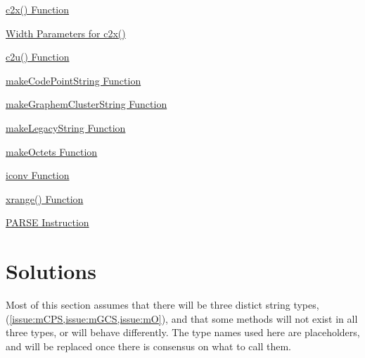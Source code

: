 \documentclass[b4paper]{article}
\begin{document}
\begin{issue}[label=I\arabic*,ref=\fbox{I\arabic*}]
\item{\href{https://github.com/users/RexxLA/projects/2/views/6?pane=issue&itemId=35730987}%
{c2x() Function}}
\label{issue:c2x}

\item{\href{https://github.com/users/RexxLA/projects/2/views/6?pane=issue&itemId=35731048}%
{Width Parameters for c2x()}}
\label{issue:c2xW}

\item{\href{https://github.com/users/RexxLA/projects/2/views/6?pane=issue&itemId=35730995}%
{c2u() Function}}
\label{issue:c2u}

\item{\href{https://github.com/users/RexxLA/projects/2/views/6?pane=issue&itemId=35731000}%
{makeCodePointString Function}}
\label{issue:mCPS}

\item{\href{https://github.com/users/RexxLA/projects/2/views/6?pane=issue&itemId=35731003}%
{makeGraphemClusterString Function}}
\label{issue:mGCS}

\item{\href{https://github.com/users/RexxLA/projects/2/views/6?pane=issue&itemId=35731012}%
{makeLegacyString Function}}
\label{issue:mLS}

\item{\href{https://github.com/users/RexxLA/projects/2/views/6?pane=issue&itemId=35731020}%
{makeOctets Function}}
\label{issue:mO}

\item{\href{https://github.com/users/RexxLA/projects/2/views/6?pane=issue&itemId=35731039}%
{iconv Function}}
\label{issue:iconv}

\item{\href{https://github.com/users/RexxLA/projects/2/views/6?pane=issue&itemId=35730875}%
{xrange() Function}}
\label{issue:xr}

\item{\href{https://github.com/users/RexxLA/projects/2/views/6?pane=issue&itemId=35731055}%
{PARSE Instruction}}
\label{issue:P}

\end{issue}


\section{Solutions}

Most of this section assumes that there will be three distict string
types, (\cref{issue:mCPS,issue:mGCS,issue:mO}),
and that some methods will not exist in all three types, or
will behave differently.
The type names used here are placeholders, and will be replaced once
there is consensus on what to call them.
\end{document}

